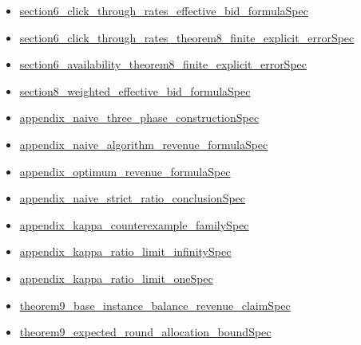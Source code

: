 \documentclass[10pt]{article}
\begin{document}
\begin{itemize}[leftmargin=1.2em]
\begin{itemize}[leftmargin=1.2em]
\item \hyperlink{source-claim-73ca4103d136519f}{section6\_\allowbreak{}click\_\allowbreak{}through\_\allowbreak{}rates\_\allowbreak{}effective\_\allowbreak{}bid\_\allowbreak{}formula\allowbreak{}Spec}
\item \hyperlink{source-claim-4b491badf63e7c26}{section6\_\allowbreak{}click\_\allowbreak{}through\_\allowbreak{}rates\_\allowbreak{}theorem8\_\allowbreak{}finite\_\allowbreak{}explicit\_\allowbreak{}error\allowbreak{}Spec}
\item \hyperlink{source-claim-5601b1ced9bdcb1e}{section6\_\allowbreak{}availability\_\allowbreak{}theorem8\_\allowbreak{}finite\_\allowbreak{}explicit\_\allowbreak{}error\allowbreak{}Spec}
\item \hyperlink{source-claim-d1d74774d9ee75ce}{section8\_\allowbreak{}weighted\_\allowbreak{}effective\_\allowbreak{}bid\_\allowbreak{}formula\allowbreak{}Spec}
\item \hyperlink{source-claim-2e933b89c9d18667}{appendix\_\allowbreak{}naive\_\allowbreak{}three\_\allowbreak{}phase\_\allowbreak{}construction\allowbreak{}Spec}
\item \hyperlink{source-claim-084d4a150e892f0f}{appendix\_\allowbreak{}naive\_\allowbreak{}algorithm\_\allowbreak{}revenue\_\allowbreak{}formula\allowbreak{}Spec}
\item \hyperlink{source-claim-257b9be0bb57b168}{appendix\_\allowbreak{}optimum\_\allowbreak{}revenue\_\allowbreak{}formula\allowbreak{}Spec}
\item \hyperlink{source-claim-b8b3787a44c14215}{appendix\_\allowbreak{}naive\_\allowbreak{}strict\_\allowbreak{}ratio\_\allowbreak{}conclusion\allowbreak{}Spec}
\item \hyperlink{source-claim-694106c40dd0af51}{appendix\_\allowbreak{}kappa\_\allowbreak{}counterexample\_\allowbreak{}family\allowbreak{}Spec}
\item \hyperlink{source-claim-5f4119723bf38020}{appendix\_\allowbreak{}kappa\_\allowbreak{}ratio\_\allowbreak{}limit\_\allowbreak{}infinity\allowbreak{}Spec}
\item \hyperlink{source-claim-1a2fb8b225b86ff5}{appendix\_\allowbreak{}kappa\_\allowbreak{}ratio\_\allowbreak{}limit\_\allowbreak{}one\allowbreak{}Spec}
\item \hyperlink{source-claim-3c4533b9f3b99b22}{theorem9\_\allowbreak{}base\_\allowbreak{}instance\_\allowbreak{}balance\_\allowbreak{}revenue\_\allowbreak{}claim\allowbreak{}Spec}
\item \hyperlink{source-claim-d63f92859f69ca1d}{theorem9\_\allowbreak{}expected\_\allowbreak{}round\_\allowbreak{}allocation\_\allowbreak{}bound\allowbreak{}Spec}

\end{itemize}
\end{itemize}
\end{document}
